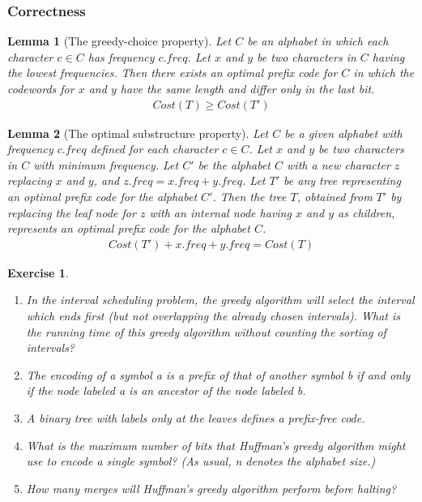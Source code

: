 \documentclass{article}
\newtheorem*{Lemma}{Lemma}
\newtheorem*{Exercise}{Exercise}
\begin{document}
\subsubsection{Correctness}
\begin{Lemma}[The greedy-choice property]\hspace*{\fill}\par
    Let $C$ be an alphabet in which each character $c \in C$ has frequency $c.freq$.  Let $x$ and $y$ be two characters in $C$ having the lowest frequencies.  Then there exists an optimal prefix code for $C$ in which the codewords for $x$ and $y$ have the same length and differ only in the last bit.
    \begin{align*}
        Cost(T)\ge Cost(T')
    \end{align*}
\end{Lemma}

\begin{Lemma}[The optimal substructure property]\hspace*{\fill}\par
    Let $C$ be a given alphabet with frequency $c.freq$ defined for each character $c \in C$.  Let $x$ and $y$ be two characters in $C$ with minimum frequency.  Let $C'$ be the alphabet $C$ with a new character $z$ replacing $x$ and $y$, and $z.freq = x.freq + y.freq$.  Let $T'$ be any tree representing an optimal prefix code for the alphabet $C'$.  Then the tree $T$, obtained from $T'$ by replacing the leaf node for $z$ with an internal node having $x$ and $y$ as children, represents an optimal prefix code for the alphabet $C$.
    \begin{align*}
        Cost(T')+x.freq+y.freq=Cost(T)
    \end{align*}
\end{Lemma}

\begin{Exercise}
    \begin{enumerate}
        \item In the interval scheduling problem, the greedy algorithm will select the interval which ends first (but not overlapping the already chosen intervals). What is the running time of this greedy algorithm without counting the sorting of intervals?
        \item The encoding of a symbol a is a prefix of that of another symbol b if and only if the node labeled a is an ancestor of the node labeled b.
        \item A binary tree with labels only at the leaves defines a prefix-free code.
        \item What is the maximum number of bits that Huffman's greedy algorithm might use to encode a single symbol? (As usual, n denotes the alphabet size.)
        \item How many merges will Huffman's greedy algorithm perform before halting?
    \end{enumerate}
\end{Exercise}
\end{document}
